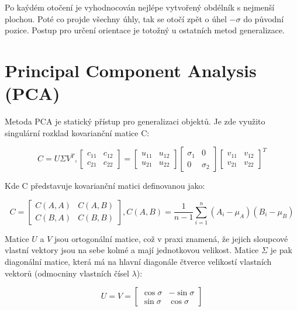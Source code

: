 \documentclass[12pt, a4paper]{article}
\begin{document}
\noindent Po kaýdém otočení je vyhodnocován nejlépe vytvořený obdélník s nejmenší plochou. Poté co projde všechny úhly, tak se otočí zpět o úhel $-\sigma$ do původní pozice. Postup pro určení orientace je totožný u ostatních metod generalizace. 

\newpage
\section {Principal Component Analysis (PCA)}
\vspace{1cm}
Metoda PCA je statický přístup pro generalizaci objektů. Je zde využito singulární rozklad kovarianční matice C:

\vspace{1cm}
$$C=U \Sigma V^T, \begin{bmatrix} c_{11} & c_{12} \\ c_{21} & c_{22} \end{bmatrix} =
\begin{bmatrix} u_{11} & u_{12} \\ u_{21} & u_{22} \end{bmatrix}
\begin{bmatrix} \sigma_1 & 0 \\ 0 & \sigma_2 \end{bmatrix}
\begin{bmatrix} v_{11} & v_{12} \\ v_{21} & v_{22} \end{bmatrix}^T$$
\vspace{1cm}

Kde C představuje kovarianční matici definovanou jako: 

$$C= \begin{bmatrix} C(A, A) & C(A, B) \\ C(B, A) & C(B, B) \end{bmatrix},
C(A, B)=\frac{1}{n-1} \sum\limits_{i=1}^{n} (A_i-\mu_A)(B_i-\mu_B)$$
\vspace{1cm}

\noindent Matice $U$ a $V$ jsou ortogonální matice, což v praxi znamená, že jejich sloupcové vlastní vektory jsou na sebe kolmé a mají jednotkovou velikost. Matice $\Sigma$ je pak diagonální matice, která má na hlavní diagonále čtverce velikostí vlastních vektorů (odmocniny vlastních čísel $\lambda$):
\vspace{1cm}

$$U=V=\begin{bmatrix} \cos \sigma & -\sin \sigma \\ \sin \sigma & \cos \sigma \end{bmatrix}$$
\vspace{1cm}
\end{document}
